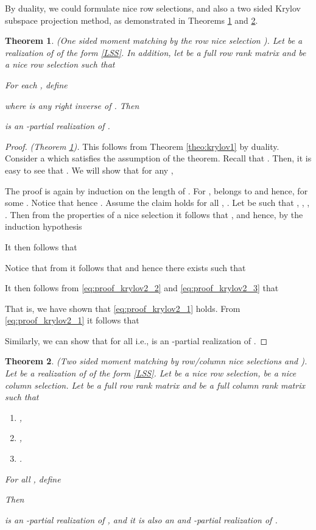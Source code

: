 \documentclass[journal]{IEEEtran}
\newtheorem{Theorem}{Theorem}
\begin{document}
By duality, we could formulate nice row selections, and also a two sided Krylov subspace projection method, as demonstrated in Theorems \ref{theo:krylov2} and \ref{theo:krylov3}.

\begin{Theorem} \label{theo:krylov2}
	\emph{(One sided moment matching by the row nice selection ).}
	Let  be a realization of  of the form \eqref{LSS}. In addition, let  be a full row rank matrix and  be a nice row selection such that
	
	For each , define
	
	where  is any right inverse of . Then
	
	is an -partial realization of .
\end{Theorem}

\begin{proof}\emph{(Theorem \ref{theo:krylov2}).}
	This follows from Theorem \ref{theo:krylov1} by duality. Consider a  which satisfies the assumption of the theorem. Recall that . Then, it is easy to see that . We will show that for any ,
	
	The proof is again by induction on the length of . For ,  belongs to  and hence,  for some . Notice that  hence . Assume the claim holds for all , . Let  be such that , , , . Then from the properties of a nice selection it follows that , and hence, by the induction hypothesis
	
	It then follows that
	
	Notice that from  it follows that  and hence there exists  such that
	
	It then follows from \eqref{eq:proof_krylov2_2} and \eqref{eq:proof_krylov2_3} that
	
	That is, we have shown that \eqref{eq:proof_krylov2_1} holds. From \eqref{eq:proof_krylov2_1} it follows that
	
	Similarly, we can show that  for all  i.e.,  is an -partial realization of .
\end{proof}

\begin{Theorem} \label{theo:krylov3}
	\emph{(Two sided moment matching by row/column nice selections  and ).}
	Let  be a realization of  of the form \eqref{LSS}. Let  be a nice row selection,  be a nice column selection. Let  be a full row rank matrix and  be a full column rank matrix such that
	\begin{enumerate}
		\item ,
		\item ,
		\item .
	\end{enumerate}
	For all , define
	
	Then
	
	is an -partial realization of , and it is also an  and -partial realization of .
\end{Theorem}
\end{document}
